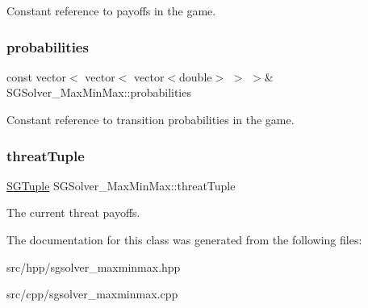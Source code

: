 Constant reference to payoffs in the game. \mbox{\label{classSGSolver__MaxMinMax_a7e0fe7fcc94931357a327bbb3efc6e85}} 
\subsubsection{\texorpdfstring{probabilities}{probabilities}}
{\footnotesize\ttfamily const vector$<$ vector$<$ vector$<$double$>$ $>$ $>$\& S\+G\+Solver\+\_\+\+Max\+Min\+Max\+::probabilities\hspace{0.3cm}{\ttfamily [private]}}

Constant reference to transition probabilities in the game. \mbox{\label{classSGSolver__MaxMinMax_a462ec472762a3b65b52d2b0973936e64}} 
\subsubsection{\texorpdfstring{threat\+Tuple}{threatTuple}}
{\footnotesize\ttfamily \hyperlink{classSGTuple}{S\+G\+Tuple} S\+G\+Solver\+\_\+\+Max\+Min\+Max\+::threat\+Tuple\hspace{0.3cm}{\ttfamily [private]}}

The current threat payoffs. 

The documentation for this class was generated from the following files\+:\begin{DoxyCompactItemize}
\item 
src/hpp/sgsolver\+\_\+maxminmax.\+hpp\item 
src/cpp/sgsolver\+\_\+maxminmax.\+cpp\end{DoxyCompactItemize}
